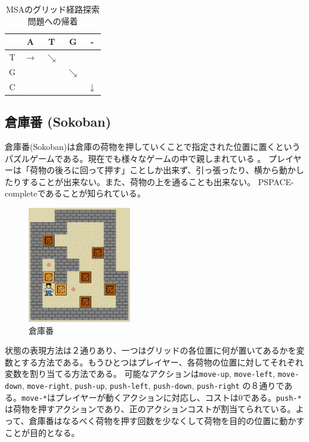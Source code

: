 \begin{table}
  \centering
\caption{MSAのグリッド経路探索問題への帰着}
\begin{tabular}{c|cccc}
  \toprule
	  & A & T & G & - \\ \midrule
	T & $\rightarrow$ & $\searrow$ &   &   \\
	G &   &   & $\searrow$ &   \\
	C &   &   &   & $\downarrow$ \\
        \bottomrule
\end{tabular}
\label{tbl:msa-to-grid}
\end{table}


\subsection{倉庫番 (Sokoban)}
倉庫番(Sokoban)は倉庫の荷物を押していくことで指定された位置に置くというパズルゲームである。現在でも様々なゲームの中で親しまれている \cite{junghanns1997sokoban,culberson:97}。
プレイヤーは「荷物の後ろに回って押す」ことしか出来ず、引っ張ったり、横から動かしたりすることが出来ない。また、荷物の上を通ることも出来ない。
PSPACE-completeであることが知られている\cite{culberson:97}。


\begin{figure}
\centering
\includegraphics[bb=0 0 213 238,width=0.4\textwidth]{figures/sokoban.eps}
\caption{倉庫番}
\label{fig:sokoban}
\end{figure}

状態の表現方法は２通りあり、一つはグリッドの各位置に何が置いてあるかを変数とする方法である。もうひとつはプレイヤー、各荷物の位置に対してそれぞれ変数を割り当てる方法である。
可能なアクションは{\tt move-up}, {\tt move-left}, {\tt move-down}, {\tt move-right}, {\tt push-up}, {\tt push-left}, {\tt push-down}, {\tt push-right} の８通りである。{\tt move-*}はプレイヤーが動くアクションに対応し、コストは0である。{\tt push-*}は荷物を押すアクションであり、正のアクションコストが割当てられている。よって、倉庫番はなるべく荷物を押す回数を少なくして荷物を目的の位置に動かすことが目的となる。

